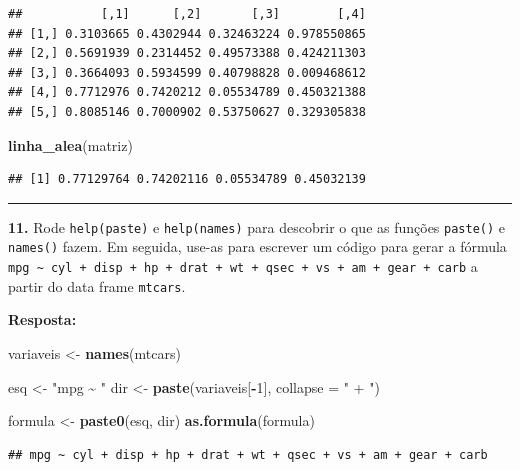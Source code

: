\documentclass[
]{book}
\newenvironment{Shaded}{\begin{snugshade}}{\end{snugshade}}
\newcommand{\DataTypeTok}[1]{\textcolor[rgb]{0.13,0.29,0.53}{#1}}
\newcommand{\DecValTok}[1]{\textcolor[rgb]{0.00,0.00,0.81}{#1}}
\newcommand{\KeywordTok}[1]{\textcolor[rgb]{0.13,0.29,0.53}{\textbf{#1}}}
\newcommand{\NormalTok}[1]{#1}
\newcommand{\OperatorTok}[1]{\textcolor[rgb]{0.81,0.36,0.00}{\textbf{#1}}}
\newcommand{\StringTok}[1]{\textcolor[rgb]{0.31,0.60,0.02}{#1}}
\begin{document}
\begin{verbatim}
##           [,1]      [,2]       [,3]        [,4]
## [1,] 0.3103665 0.4302944 0.32463224 0.978550865
## [2,] 0.5691939 0.2314452 0.49573388 0.424211303
## [3,] 0.3664093 0.5934599 0.40798828 0.009468612
## [4,] 0.7712976 0.7420212 0.05534789 0.450321388
## [5,] 0.8085146 0.7000902 0.53750627 0.329305838
\end{verbatim}

\begin{Shaded}
\begin{Highlighting}[]
\KeywordTok{linha\_alea}\NormalTok{(matriz)}
\end{Highlighting}
\end{Shaded}

\begin{verbatim}
## [1] 0.77129764 0.74202116 0.05534789 0.45032139
\end{verbatim}

\begin{center}\rule{0.5\linewidth}{0.5pt}\end{center}

\textbf{11.} Rode \texttt{help(paste)} e \texttt{help(names)} para descobrir o que as funções \texttt{paste()} e \texttt{names()} fazem. Em seguida, use-as para escrever um código para gerar a fórmula \texttt{mpg\ \textasciitilde{}\ cyl\ +\ disp\ +\ hp\ +\ drat\ +\ wt\ +\ qsec\ +\ vs\ +\ am\ +\ gear\ +\ carb} a partir do data frame \texttt{mtcars}.

\textbf{Resposta:}

\begin{Shaded}
\begin{Highlighting}[]
\NormalTok{variaveis <{-}}\StringTok{ }\KeywordTok{names}\NormalTok{(mtcars)}

\NormalTok{esq <{-}}\StringTok{ "mpg \textasciitilde{} "}
\NormalTok{dir <{-}}\StringTok{ }\KeywordTok{paste}\NormalTok{(variaveis[}\OperatorTok{{-}}\DecValTok{1}\NormalTok{], }\DataTypeTok{collapse =} \StringTok{" + "}\NormalTok{)}

\NormalTok{formula <{-}}\StringTok{ }\KeywordTok{paste0}\NormalTok{(esq, dir)}
\KeywordTok{as.formula}\NormalTok{(formula)}
\end{Highlighting}
\end{Shaded}

\begin{verbatim}
## mpg ~ cyl + disp + hp + drat + wt + qsec + vs + am + gear + carb
\end{verbatim}
\end{document}
